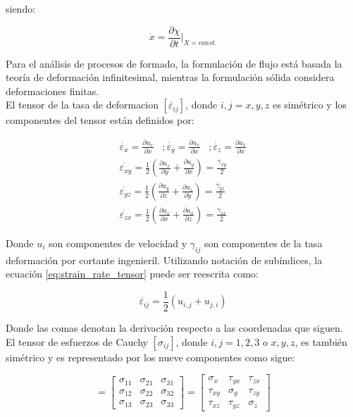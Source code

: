 siendo:

\begin{equation}
\dot{x} = \frac{\partial \chi}{\partial t} \Big\rvert_{X = const.}
\end{equation}

Para el análisis de procesos de formado, la formulación de flujo está basada la teoría 
de deformación infinitesimal, mientras la formulación sólida considera deformaciones 
finitas. \\

El tensor de la tasa de deformacion $[\dot{\varepsilon_{ij}}]$, donde $i,j = x,y,z$ es simétrico 
y los componentes del tensor están definidos por: 

\begin{eqnarray} \label{eq:strain_rate_tensor}
\dot{\varepsilon_x} = \frac{\partial u_x}{\partial x} \,\,\,\,\, ;
\dot{\varepsilon_y} = \frac{\partial u_x}{\partial x}  \,\,\,\,\, ;
\dot{\varepsilon_z} = \frac{\partial u_x}{\partial x} \\
\dot{\varepsilon_{xy}} = \frac{1}{2} \left( \frac{\partial u_x}{\partial y} + \frac{\partial u_y}{\partial x} \right) = \frac{\dot{\gamma_{xy}}}{2} \\
\dot{\varepsilon_{yz}} = \frac{1}{2} \left( \frac{\partial u_y}{\partial z} + \frac{\partial u_z}{\partial y} \right) = \frac{\dot{\gamma_{yz}}}{2} \\
\dot{\varepsilon_{zx}} = \frac{1}{2} \left( \frac{\partial u_z}{\partial x} + \frac{\partial u_x}{\partial z} \right) = \frac{\dot{\gamma_{zx}}}{2}
\end{eqnarray}

Donde $u_i$ son componentes de velocidad y $\gamma_{ij}$ son componentes de la tasa 
deformación por cortante ingenieril. Utilizando notación de subíndices, la ecuación 
\ref{eq:strain_rate_tensor} puede ser reescrita como:

\begin{equation}
\dot{\varepsilon_{ij}} = \frac{1}{2} \left( u_{i,j} + u_{j,i} \right)
\end{equation}

Donde las comas denotan la derivación respecto a las coordenadas que siguen.\\

El tensor de esfuerzos de Cauchy $[\sigma_{ij}]$, donde $i,j = 1,2,3$ o $x,y,z$, es 
también simétrico y es representado por los nueve componentes como sigue:

\begin{equation}
[\sigma_{ij}] = 
\begin{bmatrix}
\sigma_{11} & \sigma_{21} & \sigma_{31} \\
\sigma_{12} & \sigma_{22} & \sigma_{32} \\
\sigma_{13} & \sigma_{23} & \sigma_{33} 
\end{bmatrix}
=
\begin{bmatrix}
\sigma_x & \tau_{yx} & \tau_{zx} \\
\tau_{xy} & \sigma_y & \tau_{zy} \\
\tau_{xz} & \tau_{yz} & \sigma_z 
\end{bmatrix}
\end{equation}


